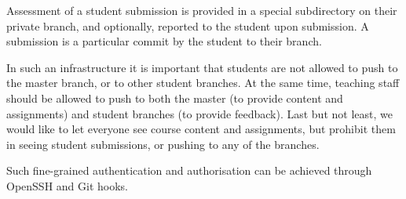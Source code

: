Assessment of a student submission is provided in a special subdirectory on
their private branch, and optionally, reported to the student upon submission.
A submission is a particular commit by the student to their branch.

In such an infrastructure it is important that students are not allowed to push
to the master branch, or to other student branches. At the same time, teaching
staff should be allowed to push to both the master (to provide content and
assignments) and student branches (to provide feedback). Last but not least, we
would like to let everyone see course content and assignments, but prohibit
them in seeing student submissions, or pushing to any of the branches.

Such fine-grained authentication and authorisation can be achieved through
OpenSSH and Git hooks.
